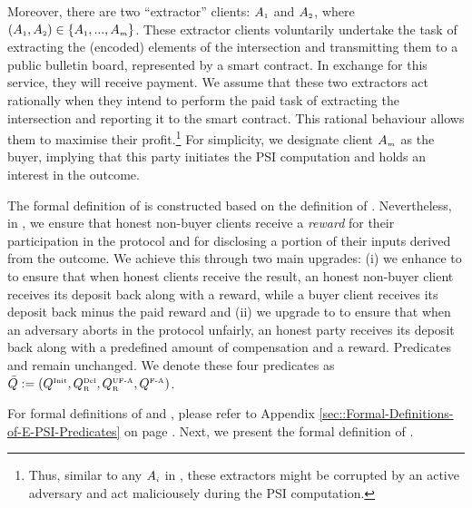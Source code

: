 Moreover,  there are two ``extractor'' clients: $A_{\scriptscriptstyle 1}$ and $A_{\scriptscriptstyle 2}$, where $(A_{\scriptscriptstyle 1},A_{\scriptscriptstyle 2})\in \{A_{\scriptscriptstyle 1},...,A_{\scriptscriptstyle m}\}$.  These extractor clients voluntarily undertake the task of extracting the (encoded) elements of the intersection and transmitting them to a public bulletin board, represented by a smart contract. In exchange for this service, they will receive payment.
%
%
We assume that these two extractors act rationally when they intend to perform the paid task of extracting the intersection and reporting it to the smart contract. This rational behaviour allows them to maximise their profit.\footnote{Thus, similar to any $A_{\scriptscriptstyle i}$ in \p, these extractors might be corrupted by an active adversary and act maliciousely during the PSI computation.} For simplicity, we designate client $A_{\scriptscriptstyle m}$ as the buyer, implying that this party initiates the PSI computation and holds an interest in the outcome.


 The formal definition of \ep is constructed based on the definition of \p. Nevertheless, in \ep, we ensure that honest non-buyer clients receive a \emph{reward} for their participation in the protocol and for disclosing a portion of their inputs derived from the outcome. We achieve this through two main upgrades:  (i)  we enhance \qdel to  \qdelwr to ensure that when honest clients receive the result, an honest non-buyer client receives its deposit back along with a reward, while a buyer client receives its deposit back minus the paid reward and (ii) we upgrade  \qUnFAbt to \qUnFAbtwr to ensure that when an adversary aborts in the protocol unfairly, an honest party receives its deposit back along with a predefined amount of compensation and a reward.  
 Predicates  \qinit and \qFAbt remain unchanged. We denote these four predicates as $\bar Q:=(Q^{\scriptscriptstyle \text{Init}},  Q^{\scriptscriptstyle \text{Del}}_{\scriptscriptstyle\text{R}}, Q^{\scriptscriptstyle \text{UF-A}}_{\scriptscriptstyle \text{R}}, Q^{\scriptscriptstyle \text{F-A}})$. 
 
 For formal definitions of \qdelwr and \qUnFAbtwr, please refer to Appendix \ref{sec::Formal-Definitions-of-E-PSI-Predicates} on page \pageref{sec::Formal-Definitions-of-E-PSI-Predicates}. 
Next, we present the formal definition of  \ep. 



